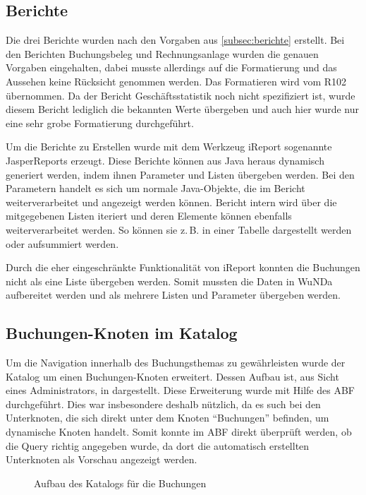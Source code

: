 \subsection{Berichte}
Die drei Berichte wurden nach den Vorgaben aus \autoref{subsec:berichte} erstellt.
Bei den Berichten Buchungsbeleg und Rechnungsanlage wurden die genauen Vorgaben eingehalten, dabei musste allerdings auf die Formatierung und das Aussehen keine Rücksicht genommen werden.
Das Formatieren wird vom R102 übernommen.
Da der Bericht Geschäftsstatistik noch nicht spezifiziert ist, wurde diesem Bericht lediglich die bekannten Werte übergeben und auch hier wurde nur eine sehr grobe Formatierung durchgeführt.

Um die Berichte zu Erstellen wurde mit dem Werkzeug iReport sogenannte JasperReports erzeugt.
Diese Berichte können aus Java heraus dynamisch generiert werden, indem ihnen Parameter und Listen übergeben werden.
Bei den Parametern handelt es sich um normale Java-Objekte, die im Bericht weiterverarbeitet und angezeigt werden können.
Bericht intern wird über die mitgegebenen Listen iteriert und deren Elemente können ebenfalls weiterverarbeitet werden.
So können sie z.\,B. in einer Tabelle dargestellt werden oder aufsummiert werden.

Durch die eher eingeschränkte Funktionalität von iReport konnten die Buchungen nicht als eine Liste übergeben werden.
Somit mussten die Daten in \ac{WuNDa} aufbereitet werden und als mehrere Listen und Parameter übergeben werden.

\subsection{Buchungen-Knoten im Katalog}
Um die Navigation innerhalb des Buchungsthemas zu gewährleisten wurde der Katalog um einen Buchungen-Knoten erweitert.
Dessen Aufbau ist, aus Sicht eines Administrators, in  dargestellt.
Diese Erweiterung wurde mit Hilfe des \ac{ABF} durchgeführt.
Dies war insbesondere deshalb nützlich, da es such bei den Unterknoten, die sich direkt unter dem Knoten "`Buchungen"' befinden, um dynamische Knoten handelt.
Somit konnte im \ac{ABF} direkt überprüft werden, ob die Query richtig angegeben wurde, da dort die automatisch erstellten Unterknoten als Vorschau angezeigt werden.
\begin{figure}[htb]
	\centering
	\caption{Aufbau des Katalogs für die Buchungen}
	\label{fig:katalog}
\end{figure}

